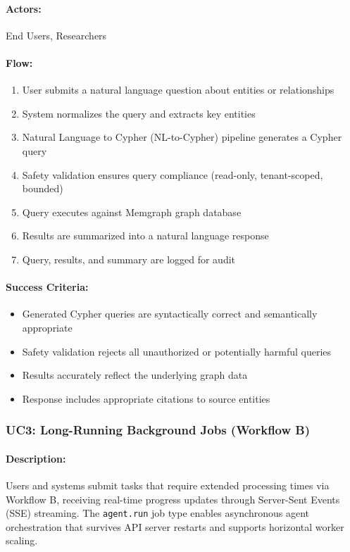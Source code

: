 \documentclass[a4paper,twoside]{sapthesis}
\begin{document}
\paragraph{Actors:} End Users, Researchers

\paragraph{Flow:}
\begin{enumerate}
    \item User submits a natural language question about entities or relationships
    \item System normalizes the query and extracts key entities
    \item Natural Language to Cypher (NL-to-Cypher) pipeline generates a Cypher query
    \item Safety validation ensures query compliance (read-only, tenant-scoped, bounded)
    \item Query executes against Memgraph graph database
    \item Results are summarized into a natural language response
    \item Query, results, and summary are logged for audit
\end{enumerate}

\paragraph{Success Criteria:}
\begin{itemize}
    \item Generated Cypher queries are syntactically correct and semantically appropriate
    \item Safety validation rejects all unauthorized or potentially harmful queries
    \item Results accurately reflect the underlying graph data
    \item Response includes appropriate citations to source entities
\end{itemize}

\subsubsection{UC3: Long-Running Background Jobs (Workflow B)}

\paragraph{Description:} Users and systems submit tasks that require extended processing times via Workflow B, receiving real-time progress updates through Server-Sent Events (SSE) streaming. The \texttt{agent.run} job type enables asynchronous agent orchestration that survives API server restarts and supports horizontal worker scaling.
\end{document}
